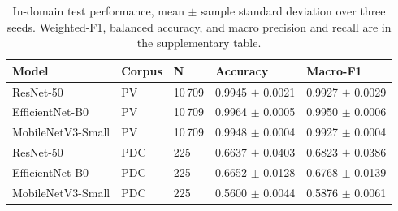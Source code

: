 \begin{table}[htbp]
\caption{In-domain test performance, mean $\pm$ sample standard deviation over three seeds. Weighted-F1, balanced accuracy, and macro precision and recall are in the supplementary table.}
\label{tab:in-domain-compact}
\footnotesize
\centering
\begin{tabular}{lllll}
\toprule
Model & Corpus & N & Accuracy & Macro-F1 \\
\midrule
ResNet-50 & PV & 10\,709 & 0.9945 $\pm$ 0.0021 & 0.9927 $\pm$ 0.0029 \\
EfficientNet-B0 & PV & 10\,709 & 0.9964 $\pm$ 0.0005 & 0.9950 $\pm$ 0.0006 \\
MobileNetV3-Small & PV & 10\,709 & 0.9948 $\pm$ 0.0004 & 0.9927 $\pm$ 0.0004 \\
ResNet-50 & PDC & 225 & 0.6637 $\pm$ 0.0403 & 0.6823 $\pm$ 0.0386 \\
EfficientNet-B0 & PDC & 225 & 0.6652 $\pm$ 0.0128 & 0.6768 $\pm$ 0.0139 \\
MobileNetV3-Small & PDC & 225 & 0.5600 $\pm$ 0.0044 & 0.5876 $\pm$ 0.0061 \\
\bottomrule
\end{tabular}
\end{table}
